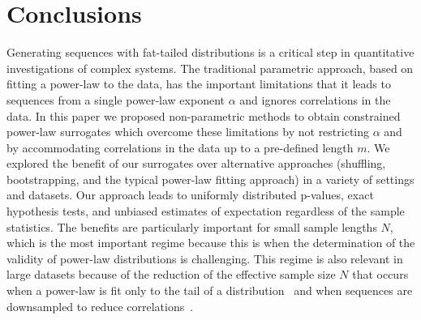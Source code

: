 \documentclass[%
prx,
reprint,
superscriptaddress,
nofootinbib,
 amsmath,amssymb,
 aps,
floatfix,
]{revtex4-2}
\begin{document}
\section{Conclusions}

Generating sequences with fat-tailed distributions is a critical step in quantitative investigations of complex systems. The traditional parametric approach, based on fitting a power-law to the data, has the important limitations that it leads to sequences from a single power-law exponent $\alpha$ and ignores correlations in the data. In this paper we proposed non-parametric methods to obtain constrained power-law surrogates which overcome these limitations by not restricting $\alpha$ and by accommodating correlations in the data up to a pre-defined length $m$. We explored the benefit of our surrogates over alternative approaches (shuffling, bootstrapping, and the typical power-law fitting approach) in a variety of settings and datasets. Our approach leads to uniformly distributed p-values, exact hypothesis tests, and unbiased estimates of expectation regardless of the sample statistics. The benefits are particularly important for small sample lengths $N$, which is the most important regime because this is when the determination of the validity of power-law distributions is challenging. This regime is also relevant in large datasets because of the reduction of the effective sample size $N$ that occurs when a power-law is fit only to the tail of a distribution~\cite{clauset2009power,broido2019scale} and when sequences are downsampled to reduce correlations~\cite{gerlach2019testing}.
\end{document}
